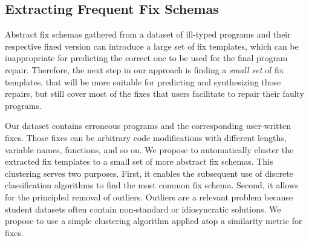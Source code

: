 


\subsection{Extracting Frequent Fix Schemas}
\label{sec:overview:learn}

Abstract fix schemas gathered from a dataset of ill-typed programs and their
respective fixed version can introduce a large set of fix templates, which can
be inappropriate for predicting the correct one to be used for the final program
repair. Therefore, the next step in our approach is finding a \emph{small set}
of fix templates, that will be more suitable for predicting and synthesizing
those repairs, but still cover most of the fixes that users facilitate to repair
their faulty programs.

 Our dataset contains erroneous programs and the
corresponding user-written fixes. Those fixes can be arbitrary code
modifications with different lengths, variable names, functions, and so on. We
propose to automatically cluster the extracted fix templates to a small set of
more abstract fix schemas. This clustering serves two purposes. First, it
enables the subsequent use of discrete classification algorithms to find the
most common fix schema. Second, it allows for the principled removal of
outliers. Outliers are a relevant problem because student datasets often contain
non-standard or idiosyncratic solutions. We propose to use a simple clustering
algorithm applied atop a similarity metric for fixes.

